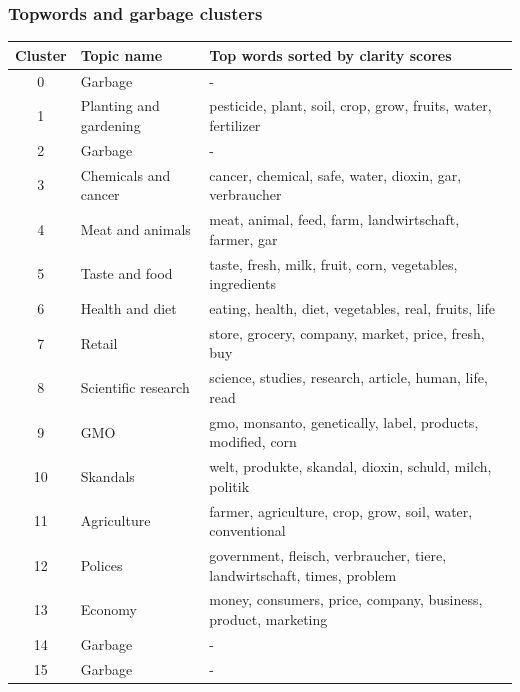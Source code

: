 \documentclass{tum-presentation}
\begin{document}
\begin{frame}
  \frametitle{Topwords and garbage clusters}
  \begin{table}[]
    \begin{tabular}{c|l|l}
    \hline
    Cluster & Topic name & Top words sorted by clarity scores\\ \hline
    0       & Garbage                & -                                                                       \\
    1       & Planting and gardening & pesticide, plant, soil, crop, grow, fruits, water, fertilizer           \\
    2       & Garbage                & -                                                                       \\
    3       & Chemicals and cancer   & cancer, chemical, safe, water, dioxin, gar, verbraucher                 \\
    4       & Meat and animals       & meat, animal, feed, farm, landwirtschaft, farmer, gar                   \\
    5       & Taste and food         & taste, fresh, milk, fruit, corn, vegetables, ingredients                \\
    6       & Health and diet        & eating, health, diet, vegetables, real, fruits, life                    \\
    7       & Retail                 & store, grocery, company, market, price, fresh, buy                      \\
    8       & Scientific research    & science, studies, research, article, human, life, read                  \\
    9       & GMO                    & gmo, monsanto, genetically, label, products, modified, corn             \\
    10      & Skandals               & welt, produkte, skandal, dioxin, schuld, milch, politik                 \\
    11      & Agriculture            & farmer, agriculture, crop, grow, soil, water, conventional              \\
    12      & Polices                & government, fleisch, verbraucher, tiere, landwirtschaft, times, problem \\
    13      & Economy                & money, consumers, price, company, business, product, marketing          \\
    14      & Garbage                & -                                                                       \\
    15      & Garbage                & -                                                                       \\ \hline
    \end{tabular}
  \end{table}
\end{frame}
\end{document}
